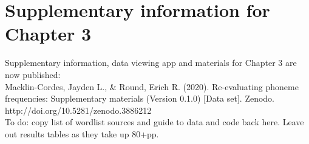 \chapter{Supplementary information for Chapter 3}

Supplementary information, data viewing app and materials for Chapter 3 are now published:\\

\noindent
Macklin-Cordes, Jayden L., \& Round, Erich R. (2020). Re-evaluating phoneme frequencies: Supplementary materials (Version 0.1.0) [Data set]. Zenodo. http://doi.org/10.5281/zenodo.3886212\\

To do: copy list of wordlist sources and guide to data and code back here. Leave out results tables as they take up 80+pp.
